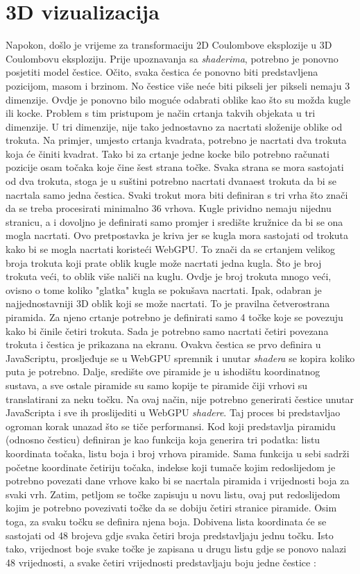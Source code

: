 \documentclass{foi}
\begin{document}
\chapter{3D vizualizacija} 
Napokon, došlo je vrijeme za transformaciju 2D Coulombove eksplozije u 3D Coulombovu eksploziju. Prije upoznavanja sa \textit{shaderima}, potrebno je ponovno posjetiti model čestice. Očito, svaka čestica će ponovno biti predstavljena pozicijom, masom i brzinom. No čestice više neće biti pikseli jer pikseli nemaju 3 dimenzije. Ovdje je ponovno bilo moguće odabrati oblike kao što su možda kugle ili kocke. Problem s tim pristupom je način crtanja takvih objekata u tri dimenzije. U tri dimenzije, nije tako jednostavno za nacrtati složenije oblike od trokuta. Na primjer, umjesto crtanja kvadrata, potrebno je nacrtati dva trokuta koja će činiti kvadrat. Tako bi za crtanje jedne kocke bilo potrebno računati pozicije osam točaka koje čine šest strana točke. Svaka strana se mora sastojati od dva trokuta, stoga je u suštini potrebno nacrtati dvanaest trokuta da bi se nacrtala samo jedna čestica. Svaki trokut mora biti definiran s tri vrha što znači da se treba procesirati minimalno 36 vrhova. Kugle prividno nemaju nijednu stranicu, a i dovoljno je definirati samo promjer i središte kružnice da bi se ona mogla nacrtati. Ovo pretpostavka je kriva jer se kugla mora sastojati od trokuta kako bi se mogla nacrtati koristeći WebGPU. To znači da se crtanjem velikog broja trokuta koji prate oblik kugle može nacrtati jedna kugla. Što je broj trokuta veći, to oblik više naliči na kuglu. Ovdje je broj trokuta mnogo veći, ovisno o tome koliko "glatka" kugla se pokušava nacrtati. Ipak, odabran je najjednostavniji 3D oblik koji se može nacrtati. To je pravilna četverostrana piramida. Za njeno crtanje potrebno je definirati samo 4 točke koje se povezuju kako bi činile četiri trokuta. Sada je potrebno samo nacrtati četiri povezana trokuta i čestica je prikazana na ekranu. Ovakva čestica se prvo definira u JavaScriptu, prosljeđuje se u WebGPU spremnik i unutar \textit{shadera} se kopira koliko puta je potrebno. Dalje, središte ove piramide je u ishodištu koordinatnog sustava, a sve ostale piramide su samo kopije te piramide čiji vrhovi su translatirani za neku točku. Na ovaj način, nije potrebno generirati čestice unutar JavaScripta i sve ih proslijediti u WebGPU \textit{shadere}. Taj proces bi predstavljao ogroman korak unazad što se tiče performansi. Kod koji predstavlja piramidu (odnosno česticu) definiran je kao funkcija koja generira tri podatka: listu koordinata točaka, listu boja i broj vrhova piramide. Sama funkcija u sebi sadrži početne koordinate četiriju točaka, indekse koji tumače kojim redoslijedom je potrebno povezati dane vrhove kako bi se nacrtala piramida i vrijednosti boja za svaki vrh. Zatim, petljom se točke zapisuju u novu listu, ovaj put redoslijedom kojim je potrebno povezivati točke da se dobiju četiri stranice piramide. Osim toga, za svaku točku se definira njena boja. Dobivena lista koordinata će se sastojati od 48 brojeva gdje svaka četiri broja predstavljaju jednu točku. Isto tako, vrijednost boje svake točke je zapisana u drugu listu gdje se ponovo nalazi 48 vrijednosti, a svake četiri vrijednosti predstavljaju boju jedne čestice \parencite{WebGPUFundamentalsCameras}:
\end{document}
